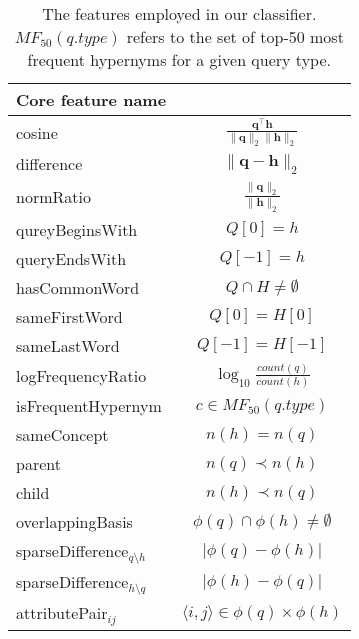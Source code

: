 \documentclass[11pt,a4paper]{article}
\begin{document}
\begin{table}
	\begin{tabular}{lc}
    \toprule
		Core feature name   & \\
    \midrule
		{cosine}            & $\frac{\mathbf{q}^\intercal \mathbf{h}}{\lVert \mathbf{q} \rVert_2\lVert \mathbf{h} \rVert_2}$ \\ %
		{difference}        & $\lVert \mathbf{q} - \mathbf{h} \rVert_2$ \\ %
		{normRatio}         & $\frac{\lVert \mathbf{q}\rVert_2}{\lVert 
		\mathbf{h} \rVert_2}$ \\ %
    \midrule
		{qureyBeginsWith}   & $Q[0] = h$ \\ %
		{queryEndsWith}     & $Q[-1] = h$ \\
		{hasCommonWord} & $Q \cap H \neq \emptyset$ \\ %
		{sameFirstWord}        & $Q[0] = H[0]$ \\ %
		{sameLastWord}        & $Q[-1] = H[-1]$ \\
		{logFrequencyRatio} & $\log_{10}\frac{count(q)}{count(h)}$ \\ %
	    {isFrequentHypernym}\footnotemark & $c \in MF_{50}(q.type)$\\
    \midrule
    sameConcept & $n(h)=n(q)$ \\
    parent  & $n(q)\prec n(h)$ \\
    child  & $n(h)\prec n(q)$ \\
    \midrule
{overlappingBasis}  & $\phi(q) \cap \phi(h) \neq \emptyset$ \\ %
{sparseDifference$_{q\setminus h}$} & $\lvert \phi(q) - \phi(h) \rvert$ \\ %
{sparseDifference$_{h\setminus q}$} & $\lvert \phi(h) - \phi(q) \rvert$ \\
attributePair$_{ij}$      & $\langle i,j\rangle\in\phi(q)\times\phi(h)$ \\ %
    \bottomrule
	\end{tabular}
  \caption{The features employed in our classifier. $MF_{50}(q.type)$ refers to 
  the set of top-50 most frequent hypernyms for a given query type.}
	\label{table:core_features}
\end{table}

\end{document}
